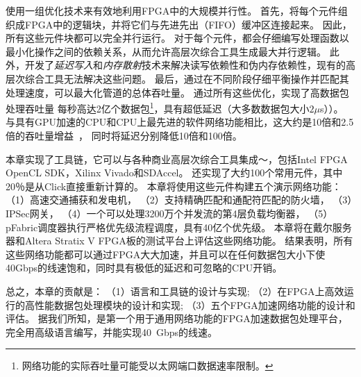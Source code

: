\name{}使用一组优化技术来有效地利用FPGA中的大规模并行性。
首先，\name{}将每个元件组织成FPGA中的逻辑块，并将它们与先进先出（FIFO）缓冲区连接起来。
因此，所有这些元件块都可以完全并行运行。
对于每个元件，都会仔细编写处理函数以最小化操作之间的依赖关系，从而允许高层次综合工具生成最大并行逻辑。
此外，开发了\textit {延迟写入}和\textit {内存散射}技术来解决读写依赖性和伪内存依赖性，现有的高层次综合工具无法解决这些问题。
最后，通过在不同阶段仔细平衡操作并匹配其处理速度，可以最大化管道的总体吞吐量。
通过所有这些优化，\name{}实现了高数据包处理吞吐量
每秒高达2亿个数据包\footnote {\name{} 网络功能的实际吞吐量可能受以太网端口数据速率限制。}，具有超低延迟（大多数数据包大小$ 2 \mu$s））。
与具有GPU加速的CPU和CPU上最先进的软件网络功能相比，这大约是10倍和2.5倍的吞吐量增益~\cite {packetshader}，
同时将延迟分别降低10倍和100倍。

本章实现了\name 工具链，它可以与各种商业高层次综合工具集成〜\cite {vivado,aoc}，包括Intel FPGA OpenCL SDK，Xilinx Vivado和SDAccel。
还实现了大约100个常用元件，其中20％是从Click直接重新计算的。
本章将使用这些元件构建五个演示网络功能：
（1）高速交通捕获和发电机，
（2）支持精确匹配和通配符匹配的防火墙，
（3）IPSec网关，
（4）一个可以处理3200万个并发流的第4层负载均衡器，
（5）pFabric调度器\cite {pfabric}执行严格优先级流程调度，具有40亿个优先级。
本章将在戴尔服务器和Altera Stratix V FPGA板的测试平台上评估这些网络功能\cite {putnam2014reconfigurable}。
结果表明，所有这些网络功能都可以通过FPGA大大加速，并且可以在任何数据包大小下使40Gbps的线速饱和，同时具有极低的延迟和可忽略的CPU开销。

总之，本章的贡献是：
（1）\name 语言和工具链的设计与实现;
（2）在FPGA上高效运行的高性能数据包处理模块的设计和实现;
（3）五个FPGA加速网络功能的设计和评估。
据我们所知，\name 是第一个用于通用网络功能的FPGA加速数据包处理平台，完全用高级语言编写，并能实现40~Gbps的线速。


